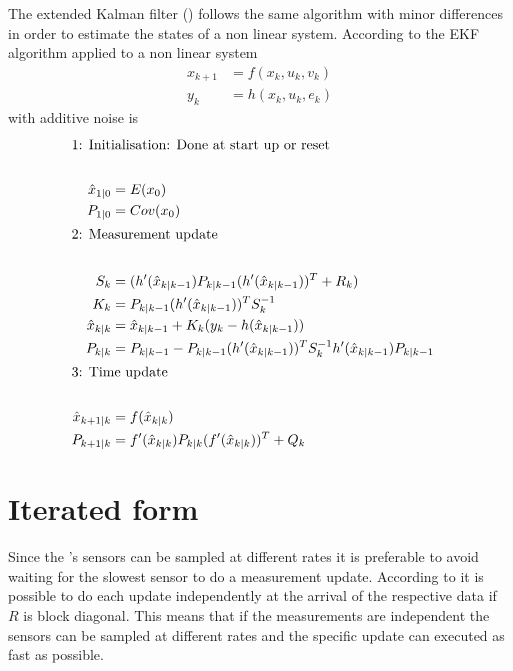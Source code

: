 The extended Kalman filter (\abbrEKF) follows the same algorithm with minor differences in order to estimate the states of a non linear system.
According to \citet[p.195-p.198]{sensorfusion} the EKF algorithm applied to a non linear system
\begin{align*}
     x_{k+1} &= f(x_{k},u_{k},v_{k})\\
     y_{k} &= h(x_{k},u_{k},e_{k})
\end{align*}
with additive noise is
\begin{align*}
    \intertext{1: Initialisation: Done at start up or reset}\\
    \hat{x}_{1|0} &= E(x_{0})\\
    P_{1|0} &= Cov(x_{0})\\
    \intertext{2: Measurement update}\\
    S_{k} &= (h'(\hat{x}_{k|k-1}) P_{k|k-1} (h'(\hat{x}_{k|k-1}))^{T} + R_{k})\\
    K_{k} &= P_{k|k-1}(h'(\hat{x}_{k|k-1}))^{T}S_{k}^{-1}\\
    \hat{x}_{k|k} &= \hat{x}_{k|k-1} + K_{k}(y_{k} - h(\hat{x}_{k|k-1}))\\
    P_{k|k} &= P_{k|k-1} - P_{k|k-1} (h'(\hat{x}_{k|k-1}))^{T}S_{k}^{-1}h'(\hat{x}_{k|k-1})P_{k|k-1}\\
    \intertext{3: Time update} \\
    \hat{x}_{k+1|k} &= f(\hat{x}_{k|k})\\
    P_{k+1|k} &= f'(\hat{x}_{k|k})P_{k|k}(f'(\hat{x}_{k|k}))^{T} + Q_{k}
\end{align*}
\section{Iterated form}
Since the \abbrROV's sensors can be sampled at different rates it is preferable to avoid waiting for the slowest sensor to do a measurement update. According to \citet[p.170]{sensorfusion} it is possible to do each update independently at the arrival of the respective data if $R$ is block diagonal. This means that if the measurements are independent the sensors can be sampled at different rates and the specific update can executed as fast as possible.  

